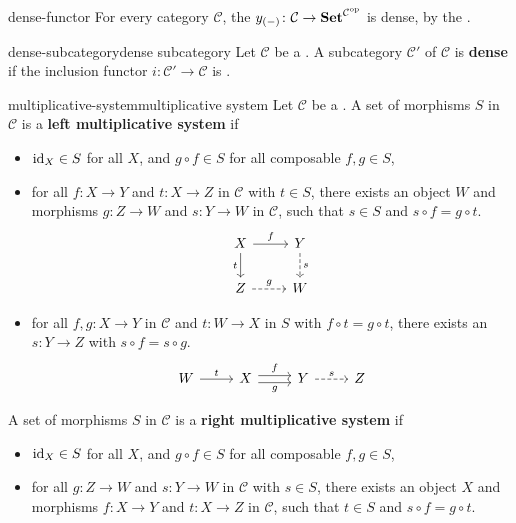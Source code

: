 \begin{example}{dense-functor}
    For every category $\mathcal{C}$, the  $y_{(-)} \colon \mathcal{C} \to \textbf{Set}^{\mathcal{C}^\textup{op}}$ is dense, by the .
\end{example}

\begin{topic}{dense-subcategory}{dense subcategory}
    Let $\mathcal{C}$ be a . A subcategory $\mathcal{C'}$ of $\mathcal{C}$ is \textbf{dense} if the inclusion functor $i \colon \mathcal{C}' \to \mathcal{C}$ is .
\end{topic}

\begin{topic}{multiplicative-system}{multiplicative system}
    Let $\mathcal{C}$ be a . A set of morphisms $S$ in $\mathcal{C}$ is a \textbf{left multiplicative system} if
    \begin{itemize}
        \item $\textup{id}_X \in S$ for all $X$, and $g \circ f \in S$ for all composable $f, g \in S$,
        \item for all $f \colon X \to Y$ and $t \colon X \to Z$ in $\mathcal{C}$ with $t \in S$, there exists an object $W$ and morphisms $g \colon Z \to W$ and $s \colon Y \to W$ in $\mathcal{C}$, such that $s \in S$ and $s \circ f = g \circ t$.
        \[ \svg \begin{tikzcd} X \arrow{r}{f} \arrow[swap]{d}{t} & Y \arrow[dashed]{d}{s} \\ Z \arrow[dashed]{r}{g} & W \end{tikzcd} \]
        \item for all $f, g \colon X \to Y$ in $\mathcal{C}$ and $t \colon W \to X$ in $S$ with $f \circ t = g \circ t$, there exists an $s \colon Y \to Z$ with $s \circ f = s \circ g$.
        \[ \svg \begin{tikzcd} W \arrow{r}{t} & X \arrow[shift left=0.25em]{r}{f} \arrow[swap, shift right=0.25em]{r}{g} & Y \arrow[dashed]{r}{s} & Z \end{tikzcd} \]
    \end{itemize}
    A set of morphisms $S$ in $\mathcal{C}$ is a \textbf{right multiplicative system} if
    \begin{itemize}
        \item $\textup{id}_X \in S$ for all $X$, and $g \circ f \in S$ for all composable $f, g \in S$,
        \item for all $g \colon Z \to W$ and $s \colon Y \to W$ in $\mathcal{C}$ with $s \in S$, there exists an object $X$ and morphisms $f \colon X \to Y$ and $t \colon X \to Z$ in $\mathcal{C}$, such that $t \in S$ and $s \circ f = g \circ t$.

\end{itemize}
\end{topic}
